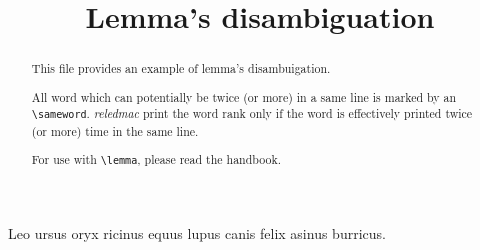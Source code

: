\documentclass{article}
\begin{document}
\begin{english}
\date{}
\title{Lemma's disambiguation}
\maketitle


\begin{abstract}
This file provides an example of lemma's disambuigation. 

All word which can potentially be twice (or more) in a same line is marked by an \verb+\sameword+. \emph{reledmac} print the word rank only if the word is effectively printed twice (or more) time in the same line. 

For use with \verb+\lemma+, please read the handbook.
 
\end{abstract}
\end{english}





\beginnumbering
\pstart
Leo  ursus  oryx  ricinus  equus 
lupus  canis  felix  asinus  burricus.

\pend
\endnumbering
\end{document}
